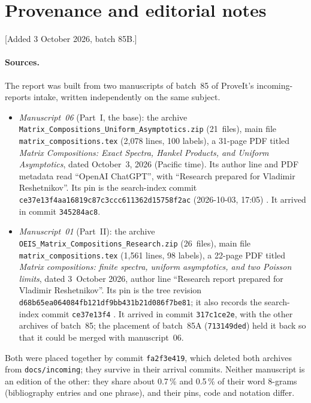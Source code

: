 \documentclass[11pt]{article}
\numberwithin{equation}{section}
\theoremstyle{definition}
\theoremstyle{remark}
\begin{document}
\section{Provenance and editorial notes}\label{mxc:app:provenance}

[Added 3 October 2026, batch 85B.]

\paragraph{Sources.} The report was built from two manuscripts of batch~85
of ProveIt's incoming-reports intake, written independently on the same
subject.
\begin{itemize}
\item \emph{Manuscript~06} (Part~I, the base): the archive
 \nolinkurl{Matrix_Compositions_Uniform_Asymptotics.zip} (21~files), main
 file \texttt{matrix\_compositions.tex} (2,078 lines, 100 labels), a
 31-page PDF titled \emph{Matrix Compositions: Exact Spectra, Hankel
 Products, and Uniform Asymptotics}, dated October~3, 2026 (Pacific time).
 Its author line and PDF metadata read ``OpenAI ChatGPT'', with ``Research
 prepared for Vladimir Reshetnikov''. Its pin is the search-index commit
 \texttt{ce37e13f4aa16819c87c3ccc611362d15758f2ac} (2026-10-03, 17:05)
 \cite{proveit}. It arrived in commit \texttt{345284ac8}.
\item \emph{Manuscript~01} (Part~II): the archive
 \nolinkurl{OEIS_Matrix_Compositions_Research.zip} (26~files), main file
 \texttt{matrix\_compositions.tex} (1,561 lines, 98 labels), a 22-page PDF
 titled \emph{Matrix compositions: finite spectra, uniform asymptotics,
 and two Poisson limits}, dated 3~October 2026, author line ``Research
 report prepared for Vladimir Reshetnikov''. Its pin is the tree revision
 \texttt{d68b65ea064084fb121df9bb431b21d086f7be81}; it also records the
 search-index commit \texttt{ce37e13f4} \cite{proveit01}. It arrived in
 commit \texttt{317c1ce2e}, with the other archives of batch~85; the
 placement of batch~85A (\texttt{713149ded}) held it back so that it could
 be merged with manuscript~06.
\end{itemize}
Both were placed together by commit \texttt{fa2f3e419}, which deleted both
archives from \texttt{docs/incoming}; they survive in their arrival
commits. Neither manuscript is an edition of the other: they share about
0.7\,\% and 0.5\,\% of their word 8-grams (bibliography entries and one
phrase), and their pins, code and notation differ.
\end{document}
